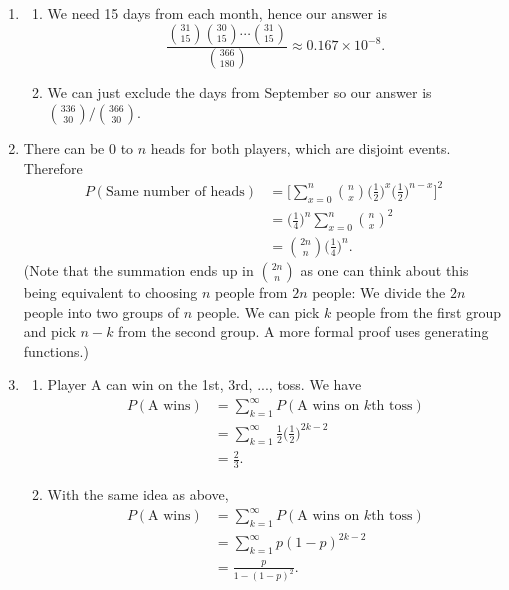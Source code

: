 \documentclass{article}
\begin{document}
\begin{enumerate}
    \item \begin{enumerate}
        \item We need 15 days from each month, hence our answer is
        \[ \frac{\binom{31}{15}\binom{30}{15}\cdots\binom{31}{15}}{\binom{366}{180}}
        \approx 0.167 \times 10^{-8}. \]

        \item We can just exclude the days from September so our answer is
        $\binom{336}{30} / \binom{366}{30}.$
    \end{enumerate}

    \item There can be 0 to $n$ heads for both players, which are disjoint events. Therefore
    \begin{align*}
        P(\text{Same number of heads})
        &= \Big[ \sum_{x = 0}^{n} \binom{n}{x} \Big(\frac{1}{2} \Big)^{x}
        \Big(\frac{1}{2} \Big)^{n - x}\Big]^2 \\
        &= \Big( \frac{1}{4} \Big)^{n} \sum_{x = 0}^{n} \binom{n}{x}^{2} \\
        &= \binom{2n}{n} \Big( \frac{1}{4} \Big)^{n}.
    \end{align*}
    (Note that the summation ends up in $\binom{2n}{n}$ as one can think about this being
    equivalent to choosing $n$ people from $2n$ people: We divide the $2n$ people into two
    groups of $n$ people. We can pick $k$ people from the first group and pick $n - k$ from
    the second group. A more formal proof uses generating functions.)

    \item \begin{enumerate}
        \item Player A can win on the 1st, 3rd, ..., toss. We have
        \begin{align*}
            P(\text{A wins})
            &= \sum_{k = 1}^{\infty} P(\text{A wins on } k \text{th toss}) \\
            &= \sum_{k = 1}^{\infty} \frac{1}{2} \Big( \frac{1}{2} \Big)^{2k - 2} \\
            &= \frac{2}{3}.
        \end{align*}

        \item With the same idea as above,
        \begin{align*}
            P(\text{A wins})
            &= \sum_{k = 1}^{\infty} P(\text{A wins on } k \text{th toss}) \\
            &= \sum_{k = 1}^{\infty} p (1 - p)^{2k - 2} \\
            &= \frac{p}{1 - (1-p)^2}.
        \end{align*}


\end{enumerate}
\end{enumerate}
\end{document}
